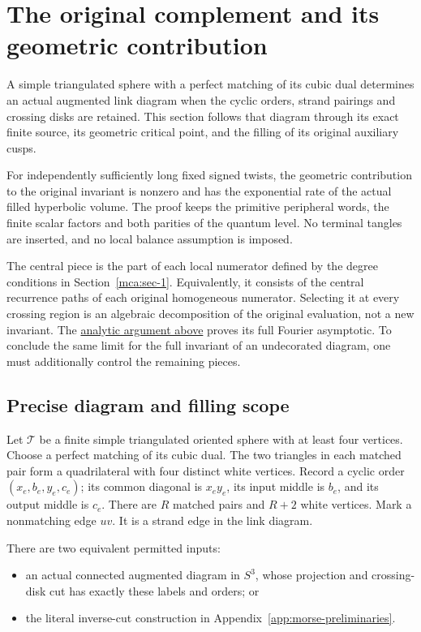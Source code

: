 \section{The original complement and its geometric
contribution}\label{mcg:unit}

A simple triangulated sphere with a perfect matching of its cubic dual
determines an actual augmented link diagram when the cyclic orders,
strand pairings and crossing disks are retained. This section follows that
diagram through its exact finite source, its geometric critical point,
and the filling of its original auxiliary cusps.

For independently sufficiently long fixed signed twists, the geometric
contribution to the original invariant is nonzero and has the
exponential rate of the actual filled hyperbolic volume. The proof keeps
the primitive peripheral words, the finite scalar factors and both
parities of the quantum level. No terminal tangles are inserted, and no
local balance assumption is imposed.

The central piece is the part of each local numerator defined by the
degree conditions in Section~\ref{mca:sec-1}. Equivalently, it consists
of the central recurrence paths of each
original homogeneous numerator. Selecting it at every crossing region is
an algebraic decomposition of the original evaluation, not a new
invariant. The
\hyperref[mca:unit]{analytic
argument above} proves its full Fourier asymptotic. To conclude the same
limit for the full invariant of an undecorated diagram, one must
additionally control the remaining pieces.

\subsection{Precise diagram and filling scope}\label{mcg:sec-1}

Let \(\mathcal T\) be a finite simple triangulated oriented sphere with
at least four vertices. Choose a perfect matching of its cubic dual. The
two triangles in each matched pair form a quadrilateral with four
distinct white vertices. Record a cyclic order \((x_e,b_e,y_e,c_e)\);
its common diagonal is \(x_ey_e\), its input middle is \(b_e\), and its
output middle is \(c_e\). There are \(R\) matched pairs and \(R+2\)
white vertices. Mark a nonmatching edge \(uv\). It is a strand edge in
the link diagram.

There are two equivalent permitted inputs:

\begin{itemize}
\item
  an actual connected augmented diagram in \(S^3\), whose projection and
  crossing-disk cut has exactly these labels and orders; or
\item
  the literal inverse-cut construction in
  Appendix~\ref{app:morse-preliminaries}.
\end{itemize}

